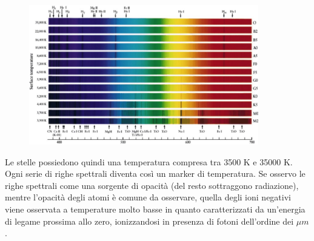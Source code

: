 \documentclass[a4paper,11pt]{article}
\begin{document}
     \begin{figure}[h!!]
        \centering
        \includegraphics[width=10cm]{174642.jpg}
        \label{}
      \end{figure}

      Le stelle possiedono quindi una temperatura compresa tra 3500 K e 35000 K. Ogni serie di righe spettrali diventa così un marker di temperatura. Se osservo le righe spettrali come una sorgente di opacità (del resto sottraggono radiazione), mentre l'opacità degli atomi è comune da osservare, quella degli ioni negativi viene osservata a temperature molto basse in quanto caratterizzati da un'energia di legame prossima allo zero, ionizzandosi in presenza di fotoni dell'ordine dei ${\mu}m$.\\
      
\end{document}
